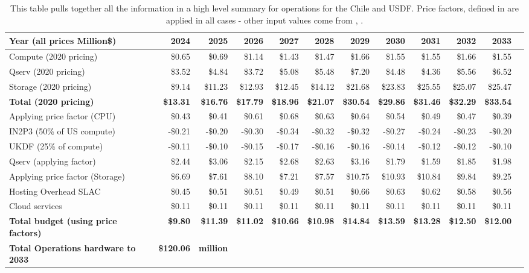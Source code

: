 \tiny \begin{longtable} { |p{}  |r  |r  |r  |r  |r  |r  |r  |r  |r  |r  |r |} 
\caption{This table pulls together all the information in a high level summary for operations  for the Chile and USDF. Price factors, defined in  are applied in all cases - other input values come from , .
 \label{tab:opsSummary}}\\ 
\hline 
\textbf{Year  (all prices Million\$)}&\textbf{2024}&\textbf{2025}&\textbf{2026}&\textbf{2027}&\textbf{2028}&\textbf{2029}&\textbf{2030}&\textbf{2031}&\textbf{2032}&\textbf{2033} \\ \hline
{Compute (2020 pricing)}&{\$0.65}&{\$0.69}&{\$1.14}&{\$1.43}&{\$1.47}&{\$1.66}&{\$1.55}&{\$1.55}&{\$1.66}&{\$1.55} \\ \hline
{Qserv (2020 pricing)}&{\$3.52}&{\$4.84}&{\$3.72}&{\$5.08}&{\$5.48}&{\$7.20}&{\$4.48}&{\$4.36}&{\$5.56}&{\$6.52} \\ \hline
{Storage (2020 pricing)}&{\$9.14}&{\$11.23}&{\$12.93}&{\$12.45}&{\$14.12}&{\$21.68}&{\$23.83}&{\$25.55}&{\$25.07}&{\$25.47} \\ \hline
\textbf{Total (2020 pricing)}&\textbf{\$13.31}&\textbf{\$16.76}&\textbf{\$17.79}&\textbf{\$18.96}&\textbf{\$21.07}&\textbf{\$30.54}&\textbf{\$29.86}&\textbf{\$31.46}&\textbf{\$32.29}&\textbf{\$33.54} \\ \hline
{Applying price factor (CPU)}&{\$0.43}&{\$0.41}&{\$0.61}&{\$0.68}&{\$0.63}&{\$0.64}&{\$0.54}&{\$0.49}&{\$0.47}&{\$0.39} \\ \hline
{IN2P3 (50\% of US compute)}&{-\$0.21}&{-\$0.20}&{-\$0.30}&{-\$0.34}&{-\$0.32}&{-\$0.32}&{-\$0.27}&{-\$0.24}&{-\$0.23}&{-\$0.20} \\ \hline
{UKDF (25\% of compute)}&{-\$0.11}&{-\$0.10}&{-\$0.15}&{-\$0.17}&{-\$0.16}&{-\$0.16}&{-\$0.14}&{-\$0.12}&{-\$0.12}&{-\$0.10} \\ \hline
{Qserv (applying factor)}&{\$2.44}&{\$3.06}&{\$2.15}&{\$2.68}&{\$2.63}&{\$3.16}&{\$1.79}&{\$1.59}&{\$1.85}&{\$1.98} \\ \hline
{Applying price factor (Storage)}&{\$6.69}&{\$7.61}&{\$8.10}&{\$7.21}&{\$7.57}&{\$10.75}&{\$10.93}&{\$10.84}&{\$9.84}&{\$9.25} \\ \hline
{Hosting Overhead SLAC}&{\$0.45}&{\$0.51}&{\$0.51}&{\$0.49}&{\$0.51}&{\$0.66}&{\$0.63}&{\$0.62}&{\$0.58}&{\$0.56} \\ \hline
{Cloud services}&{\$0.11}&{\$0.11}&{\$0.11}&{\$0.11}&{\$0.11}&{\$0.11}&{\$0.11}&{\$0.11}&{\$0.11}&{\$0.11} \\ \hline
\textbf{Total budget (using price factors)}&\textbf{\$9.80}&\textbf{\$11.39}&\textbf{\$11.02}&\textbf{\$10.66}&\textbf{\$10.98}&\textbf{\$14.84}&\textbf{\$13.59}&\textbf{\$13.28}&\textbf{\$12.50}&\textbf{\$12.00} \\ \hline
\textbf{Total Operations hardware to 2033}&\textbf{\$120.06}&\textbf{million}&&&&&&&& \\ \hline
\end{longtable} \normalsize
